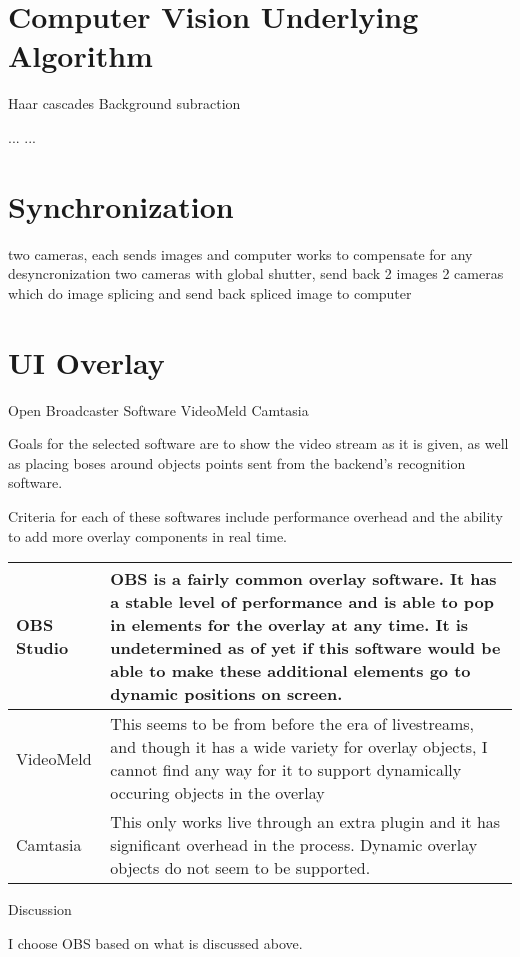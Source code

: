 \documentclass[letterpaper,10pt,onecolumn,draftclsnofoot]{IEEEtran}
\begin{document}
\section{Computer Vision Underlying Algorithm} %

Haar cascades
Background subraction

...
...

\section{Synchronization} %

two cameras, each sends images and computer works to compensate for any desyncronization
two cameras with global shutter, send back 2 images
2 cameras which do image splicing and send back spliced image to computer

\section{UI Overlay} %

Open Broadcaster Software
VideoMeld
Camtasia

Goals for the selected software are to show the video stream as it is given, as well as placing boses around objects points sent from the backend's recognition software.

Criteria for each of these softwares include performance overhead and the ability to add more overlay components in real time.

\begin{tabular}{ l l }
  OBS Studio & OBS is a fairly common overlay software.  It has a stable level of performance and is able to pop in elements for the overlay at any time.  It is undetermined as of yet if this software would be able to make these additional elements go to dynamic positions on screen. \\ \hline
  VideoMeld & This seems to be from before the era of livestreams, and though it has a wide variety for overlay objects, I cannot find any way for it to support dynamically occuring objects in the overlay  \\ \hline
  Camtasia & This only works live through an extra plugin and it has significant overhead in the process.  Dynamic overlay objects do not seem to be supported. \\
\end{tabular}

Discussion

I choose OBS based on what is discussed above.
\end{document}
